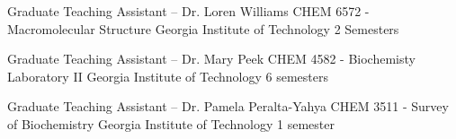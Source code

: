 

\begin{cventries}

  \cventry
    {Graduate Teaching Assistant -- Dr. Loren Williams} %
    {CHEM 6572 - Macromolecular Structure} %
    {Georgia Institute of Technology} %
    {2 Semesters} %
    {}
\vspace{-4.0mm}

  \cventry
    {Graduate Teaching Assistant -- Dr. Mary Peek} %
    {CHEM 4582 - Biochemisty Laboratory II} %
    {Georgia Institute of Technology} %
    {6 semesters} %
{}
\vspace{-4.0mm}

  \cventry
    {Graduate Teaching Assistant -- Dr. Pamela Peralta-Yahya} %
    {CHEM 3511 - Survey of Biochemistry} %
    {Georgia Institute of Technology} %
    {1 semester} %
    {}

\vspace{-4.0mm}
\end{cventries}

